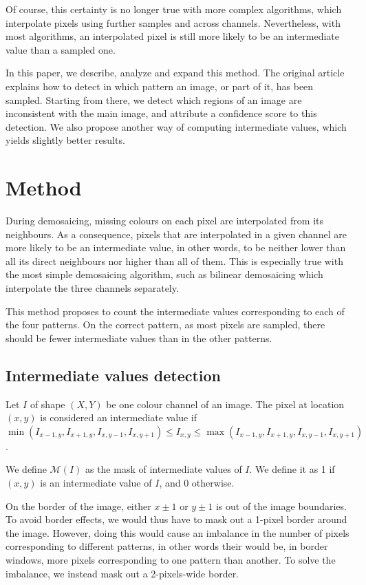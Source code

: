 \documentclass{ipol}
\begin{document}
Of course, this certainty is no longer true with more complex algorithms, which interpolate pixels using further samples and across channels. Nevertheless, with most algorithms, an interpolated pixel is still more likely to be an intermediate value than a sampled one.

In this paper, we describe, analyze and expand this method.
The original article explains how to detect in which pattern an image, or part of it, has been sampled. Starting from there, we detect which regions of an image are inconsistent with the main image, and attribute a confidence score to this detection.
We also propose another way of computing intermediate values, which yields slightly better results. 

\section{Method}
During demosaicing, missing colours on each pixel are interpolated from its neighbours. As a consequence, pixels that are interpolated in a given channel are more likely to be an intermediate value, in other words, to be neither lower than all its direct neighbours nor higher than all of them. This is especially true with the most simple demosaicing algorithm, such as bilinear demosaicing which interpolate the three channels separately.

This method proposes to count the intermediate values corresponding to each of the four patterns. On the correct pattern, as most pixels are sampled, there should be fewer intermediate values than in the other patterns.

\subsection{Intermediate values detection}
Let $I$ of shape $(X, Y)$ be one colour channel of an image. The pixel at location $(x, y)$ is considered an intermediate value if $\min(I_{x-1, y}, I_{x+1, y}, I_{x, y-1}, I_{x, y+1}) \leq I_{x, y} \leq \max(I_{x-1, y}, I_{x+1, y}, I_{x, y-1}, I_{x, y+1})$.

We define $\mathcal M(I)$ as the mask of intermediate values of $I$. We define it as 1 if $(x, y)$ is an intermediate value of $I$, and $0$ otherwise.

On the border of the image, either $x\pm1$ or $y\pm1$ is out of the image boundaries. To avoid border effects, we would thus have to mask out a 1-pixel border around the image. However, doing this would cause an imbalance in the number of pixels corresponding to different patterns, in other words their would be, in border windows, more pixels corresponding to one pattern than another. To solve the imbalance, we instead mask out a 2-pixels-wide border.
\end{document}
